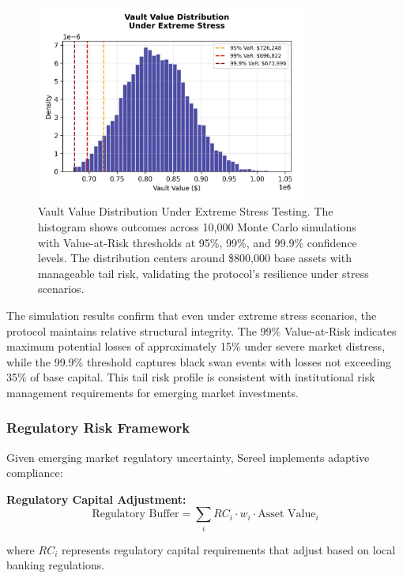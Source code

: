 \documentclass[12pt]{article}
\begin{document}
\begin{figure}[h]
    \centering
    \includegraphics[width=0.8\textwidth]{vault_value_distribution.jpeg}
    \caption{Vault Value Distribution Under Extreme Stress Testing. The histogram shows outcomes across 10,000 Monte Carlo simulations with Value-at-Risk thresholds at 95\%, 99\%, and 99.9\% confidence levels. The distribution centers around \$800,000 base assets with manageable tail risk, validating the protocol's resilience under stress scenarios.}
    \label{fig:vault_distribution}
\end{figure}

The simulation results confirm that even under extreme stress scenarios, the protocol maintains relative structural integrity. The 99\% Value-at-Risk indicates maximum potential losses of approximately 15\% under severe market distress, while the 99.9\% threshold captures black swan events with losses not exceeding 35\% of base capital. This tail risk profile is consistent with institutional risk management requirements for emerging market investments.

\subsubsection{Regulatory Risk Framework}

Given emerging market regulatory uncertainty, Sereel implements adaptive compliance:

\textbf{Regulatory Capital Adjustment:}
\begin{equation}
\text{Regulatory Buffer} = \sum_i RC_i \cdot w_i \cdot \text{Asset Value}_i
\end{equation}

where $RC_i$ represents regulatory capital requirements that adjust based on local banking regulations.
\end{document}
